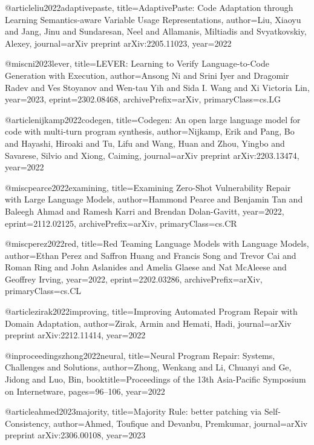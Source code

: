 @article{liu2022adaptivepaste,
  title={AdaptivePaste: Code Adaptation through Learning Semantics-aware Variable Usage Representations},
  author={Liu, Xiaoyu and Jang, Jinu and Sundaresan, Neel and Allamanis, Miltiadis and Svyatkovskiy, Alexey},
  journal={arXiv preprint arXiv:2205.11023},
  year={2022}
}

@misc{ni2023lever,
      title={LEVER: Learning to Verify Language-to-Code Generation with Execution},
      author={Ansong Ni and Srini Iyer and Dragomir Radev and Ves Stoyanov and Wen-tau Yih and Sida I. Wang and Xi Victoria Lin},
      year={2023},
      eprint={2302.08468},
      archivePrefix={arXiv},
      primaryClass={cs.LG}
}

@article{nijkamp2022codegen,
  title={Codegen: An open large language model for code with multi-turn program synthesis},
  author={Nijkamp, Erik and Pang, Bo and Hayashi, Hiroaki and Tu, Lifu and Wang, Huan and Zhou, Yingbo and Savarese, Silvio and Xiong, Caiming},
  journal={arXiv preprint arXiv:2203.13474},
  year={2022}
}

@misc{pearce2022examining,
      title={Examining Zero-Shot Vulnerability Repair with Large Language Models},
      author={Hammond Pearce and Benjamin Tan and Baleegh Ahmad and Ramesh Karri and Brendan Dolan-Gavitt},
      year={2022},
      eprint={2112.02125},
      archivePrefix={arXiv},
      primaryClass={cs.CR}
}

@misc{perez2022red,
      title={Red Teaming Language Models with Language Models},
      author={Ethan Perez and Saffron Huang and Francis Song and Trevor Cai and Roman Ring and John Aslanides and Amelia Glaese and Nat McAleese and Geoffrey Irving},
      year={2022},
      eprint={2202.03286},
      archivePrefix={arXiv},
      primaryClass={cs.CL}
}

@article{zirak2022improving,
  title={Improving Automated Program Repair with Domain Adaptation},
  author={Zirak, Armin and Hemati, Hadi},
  journal={arXiv preprint arXiv:2212.11414},
  year={2022}
}

@inproceedings{zhong2022neural,
  title={Neural Program Repair: Systems, Challenges and Solutions},
  author={Zhong, Wenkang and Li, Chuanyi and Ge, Jidong and Luo, Bin},
  booktitle={Proceedings of the 13th Asia-Pacific Symposium on Internetware},
  pages={96--106},
  year={2022}
}

@article{ahmed2023majority,
  title={Majority Rule: better patching via Self-Consistency},
  author={Ahmed, Toufique and Devanbu, Premkumar},
  journal={arXiv preprint arXiv:2306.00108},
  year={2023}
}


